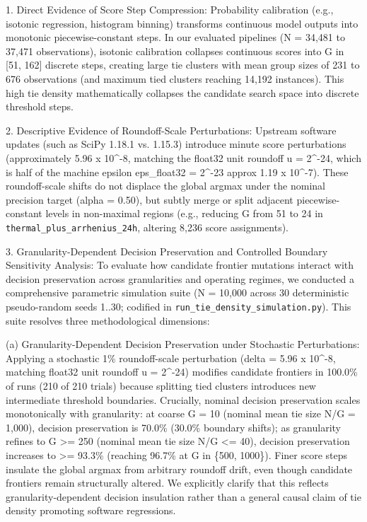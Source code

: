 \documentclass[11pt,a4paper]{article}
\begin{document}
1. Direct Evidence of Score Step Compression: Probability calibration (e.g., isotonic regression, histogram binning) transforms continuous model outputs into monotonic piecewise-constant steps. In our evaluated pipelines (N = 34,481 to 37,471 observations), isotonic calibration collapses continuous scores into G in [51, 162] discrete steps, creating large tie clusters with mean group sizes of 231 to 676 observations (and maximum tied clusters reaching 14,192 instances). This high tie density mathematically collapses the candidate search space into discrete threshold steps.

2. Descriptive Evidence of Roundoff-Scale Perturbations: Upstream software updates (such as SciPy 1.18.1 vs. 1.15.3) introduce minute score perturbations (approximately 5.96 x 10\textasciicircum{}-8, matching the float32 unit roundoff u = 2\textasciicircum{}-24, which is half of the machine epsilon eps\_float32 = 2\textasciicircum{}-23 approx 1.19 x 10\textasciicircum{}-7). These roundoff-scale shifts do not displace the global argmax under the nominal precision target (alpha = 0.50), but subtly merge or split adjacent piecewise-constant levels in non-maximal regions (e.g., reducing G from 51 to 24 in \texttt{thermal\_\allowbreak{}plus\_\allowbreak{}arrhenius\_\allowbreak{}24h}, altering 8,236 score assignments).

3. Granularity-Dependent Decision Preservation and Controlled Boundary Sensitivity Analysis: To evaluate how candidate frontier mutations interact with decision preservation across granularities and operating regimes, we conducted a comprehensive parametric simulation suite (N = 10,000 across 30 deterministic pseudo-random seeds 1..30; codified in \texttt{run\_\allowbreak{}tie\_\allowbreak{}density\_\allowbreak{}simulation.\allowbreak{}py}). This suite resolves three methodological dimensions:

(a) Granularity-Dependent Decision Preservation under Stochastic Perturbations: Applying a stochastic 1\% roundoff-scale perturbation (delta = 5.96 x 10\textasciicircum{}-8, matching float32 unit roundoff u = 2\textasciicircum{}-24) modifies candidate frontiers in 100.0\% of runs (210 of 210 trials) because splitting tied clusters introduces new intermediate threshold boundaries. Crucially, nominal decision preservation scales monotonically with granularity: at coarse G = 10 (nominal mean tie size N/G = 1,000), decision preservation is 70.0\% (30.0\% boundary shifts); as granularity refines to G >= 250 (nominal mean tie size N/G <= 40), decision preservation increases to >= 93.3\% (reaching 96.7\% at G in \{500, 1000\}). Finer score steps insulate the global argmax from arbitrary roundoff drift, even though candidate frontiers remain structurally altered. We explicitly clarify that this reflects granularity-dependent decision insulation rather than a general causal claim of tie density promoting software regressions.
\end{document}
